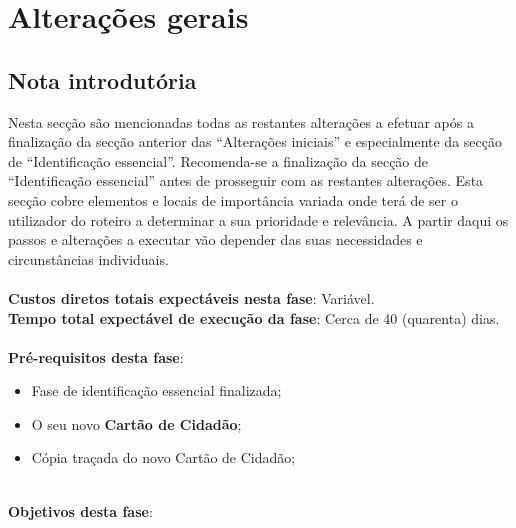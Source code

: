 
\newpage

\section{Alterações gerais}

\subsection{Nota introdutória}

Nesta secção são mencionadas todas as restantes alterações a efetuar
após a finalização da secção anterior das ``Alterações iniciais'' e
especialmente da secção de ``Identificação essencial''. Recomenda-se a
finalização da secção de ``Identificação essencial'' antes de prosseguir
com as restantes alterações. Esta secção cobre elementos e locais de
importância variada onde terá de ser o utilizador do roteiro a
determinar a sua prioridade e relevância. A partir daqui os passos e
alterações a executar vão depender das suas necessidades e
circunstâncias individuais. \\
\\
\textbf{Custos diretos totais expectáveis nesta fase}: Variável. \\
\textbf{Tempo total expectável de execução da fase}: Cerca de 40 (quarenta) dias. \\
\\
\textbf{Pré-requisitos desta fase}:
\begin{itemize}
	\item Fase de identificação essencial finalizada;
	\item O seu novo \textbf{Cartão de Cidadão};
	\item Cópia traçada do novo Cartão de Cidadão;
\end{itemize}
\leavevmode\\
\textbf{Objetivos desta fase}:
